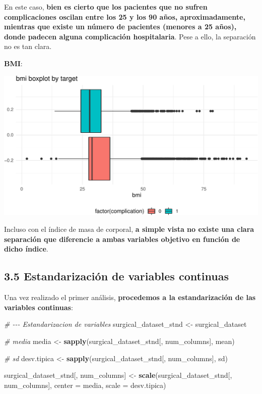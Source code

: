 \documentclass[
]{article}
\newenvironment{Shaded}{\begin{snugshade}}{\end{snugshade}}
\newcommand{\CommentTok}[1]{\textcolor[rgb]{0.56,0.35,0.01}{\textit{#1}}}
\newcommand{\DataTypeTok}[1]{\textcolor[rgb]{0.13,0.29,0.53}{#1}}
\newcommand{\KeywordTok}[1]{\textcolor[rgb]{0.13,0.29,0.53}{\textbf{#1}}}
\newcommand{\NormalTok}[1]{#1}
\newcommand{\StringTok}[1]{\textcolor[rgb]{0.31,0.60,0.02}{#1}}
\begin{document}
En este caso, \textbf{bien es cierto que los pacientes que no sufren
complicaciones oscilan entre los 25 y los 90 años, aproximadamente,
mientras que existe un número de pacientes (menores a 25 años), donde
padecen alguna complicación hospitalaria}. Pese a ello, la separación no
es tan clara.

\textbf{BMI}:

\includegraphics{memoria_files/figure-latex/unnamed-chunk-22-1}

Incluso con el índice de masa de corporal, \textbf{a simple vista no
existe una clara separación que diferencie a ambas variables objetivo en
función de dicho índice}.

\hypertarget{estandarizaciuxf3n-de-variables-continuas}{%
\subsection{3.5 Estandarización de variables
continuas}\label{estandarizaciuxf3n-de-variables-continuas}}

Una vez realizado el primer análisis, \textbf{procedemos a la
estandarización de las variables continuas}:

\begin{Shaded}
\begin{Highlighting}[]
\CommentTok{\# {-}{-}{-} Estandarizacion de variables}
\NormalTok{surgical\_dataset\_stnd <{-}}\StringTok{ }\NormalTok{surgical\_dataset}

\CommentTok{\# media}
\NormalTok{media       <{-}}\StringTok{ }\KeywordTok{sapply}\NormalTok{(surgical\_dataset\_stnd[, num\_columns], mean)}

\CommentTok{\# sd}
\NormalTok{desv.tipica <{-}}\StringTok{ }\KeywordTok{sapply}\NormalTok{(surgical\_dataset\_stnd[, num\_columns], sd)}

\NormalTok{surgical\_dataset\_stnd[, num\_columns] <{-}}\StringTok{ }\KeywordTok{scale}\NormalTok{(surgical\_dataset\_stnd[, num\_columns], }
                                              \DataTypeTok{center =}\NormalTok{ media, }
                                              \DataTypeTok{scale =}\NormalTok{ desv.tipica)}
\end{Highlighting}
\end{Shaded}
\end{document}
